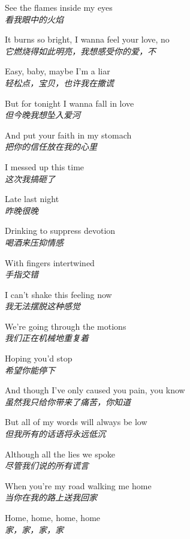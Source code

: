 \begin{spacing}{1.5}
\begin{flushleft}
See the flames inside my eyes\\
\textit{看我眼中的火焰}\lyricspace

It burns so bright, I wanna feel your love, no\\
\textit{它燃烧得如此明亮，我想感受你的爱，不}\lyricspace

Easy, baby, maybe I'm a liar\\
\textit{轻松点，宝贝，也许我在撒谎}\lyricspace

But for tonight I wanna fall in love\\
\textit{但今晚我想坠入爱河}\lyricspace

And put your faith in my stomach\\
\textit{把你的信任放在我的心里}\lyricspace

I messed up this time\\
\textit{这次我搞砸了}\lyricspace

Late last night\\
\textit{昨晚很晚}\lyricspace

Drinking to suppress devotion\\
\textit{喝酒来压抑情感}\lyricspace

With fingers intertwined\\
\textit{手指交错}\lyricspace

I can't shake this feeling now\\
\textit{我无法摆脱这种感觉}\lyricspace

We're going through the motions\\
\textit{我们正在机械地重复着}\lyricspace

Hoping you'd stop\\
\textit{希望你能停下}\lyricspace

And though I've only caused you pain, you know\\
\textit{虽然我只给你带来了痛苦，你知道}\lyricspace

But all of my words will always be low\\
\textit{但我所有的话语将永远低沉}\lyricspace

Although all the lies we spoke\\
\textit{尽管我们说的所有谎言}\lyricspace

When you're my road walking me home\\
\textit{当你在我的路上送我回家}\lyricspace

Home, home, home, home\\
\textit{家，家，家，家}\lyricspace


\end{flushleft}
\end{spacing}
